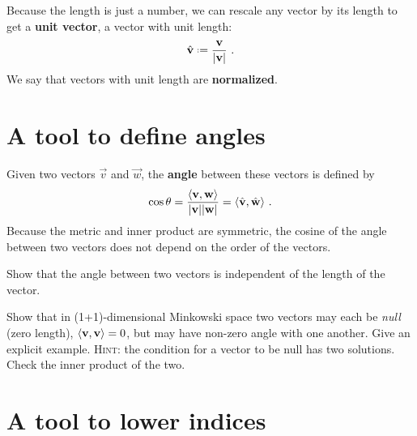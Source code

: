 \documentclass[12pt, oneside]{report}    %
\let\oldsection\section
\def\section{%
  \setcounter{sidenote}{1}%
  \oldsection
}
\begin{document}
Because the length is just a number, we can rescale any vector by its length to get a \textbf{unit vector}, a vector with unit length:
\begin{align}
    \hat{\vec{v}} \defeq \frac{\vec{v}}{|\vec{v}|} \ .
\end{align}
We say that vectors with unit length are \textbf{normalized}. 


\section{A tool to define angles}

Given two vectors $\vec{v}$ and $\vec{w}$, the \textbf{angle} between these vectors is defined by
\begin{align}
    \cos\theta = \frac{\langle \mathbf{v}, \mathbf{w} \rangle}{|\mathbf{v}| |\mathbf{w}|}
    =
    \langle \hat{\mathbf{v}}, \hat{\mathbf{w}} \rangle \ .
    \label{eq:cos:theta:angle:defined:metric}
\end{align}
Because the metric and inner product are symmetric, the cosine of the angle between two vectors does not depend on the order of the vectors.

\begin{exercise}
Show that the angle between two vectors is independent of the length of the vector. 
\end{exercise}

\begin{exercise}
Show that in (1+1)-dimensional Minkowski space two vectors may each be \emph{null} (zero length), $\langle \mathbf{v},\mathbf{v}\rangle =0$, but may have non-zero angle with one another. Give an explicit example.  \textsc{Hint}: the condition for a vector to be null has two solutions. Check the inner product of the two.
\end{exercise}


\section{A tool to lower indices}
\label{{sec:machine:to:make:row:vectors}}
\end{document}
